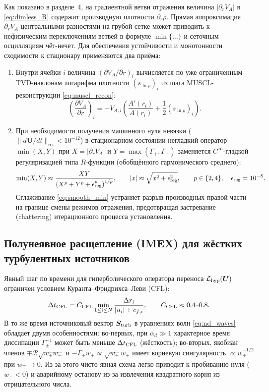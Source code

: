 \documentclass[11pt,a4paper]{article}
\begin{document}
Как показано в разделе~4, на градиентной ветви отражения величина $|\partial_r V_A|$ в \eqref{eq:dimless_R} содержит производную плотности $\partial_r\rho$. Прямая аппроксимация $\partial_r V_A$ центральными разностями на грубой сетке может приводить к нефизическим переключениям ветвей в формуле $\min\{\dots\}$ и сеточным осцилляциям чёт-нечет. Для обеспечения устойчивости и монотонности сходимости к стационару применяются два приёма:
\begin{enumerate}
\item Внутри ячейки $i$ величина $(\partial V_A/\partial r)_i$ вычисляется по уже ограниченным TVD-наклонам логарифма плотности $(s_{\ln\rho})_i$ из шага MUSCL-реконструкции \eqref{eq:muscl_recon}:
\begin{equation}
\left(\frac{\partial V_A}{\partial r}\right)_i = -V_{A,i}\left(\frac{A'(r_i)}{A(r_i)} + \frac{1}{2}(s_{\ln\rho})_i\right).
\label{eq:dva_tvd}
\end{equation}
\item При необходимости получения машинного нуля невязки ($\|d\bm{U}/dt\|_\infty < 10^{-12}$) в стационарном состоянии негладкий оператор $\min(X, Y)$ при $X = |\partial_r V_A|$ и $Y = \max(\Gamma_+,\Gamma_-)$ заменяется $C^\infty$-гладкой регуляризацией типа $R$-функции (обобщённого гармонического среднего):
\begin{equation}
\min(X, Y) \approx \frac{X Y}{\left(X^p + Y^p + \epsilon_{\rm reg}^p\right)^{1/p}}, \qquad
|x| \approx \sqrt{x^2 + \epsilon_{\rm reg}^2}, \qquad p \in \{2, 4\}, \quad \epsilon_{\rm reg} = 10^{-8}.
\label{eq:smooth_min}
\end{equation}
Сглаживание \eqref{eq:smooth_min} устраняет разрыв производных правой части на границе смены режимов отражения, предотвращая застревание (chattering) итерационного процесса установления.
\end{enumerate}

\subsection{Полунеявное расщепление (IMEX) для жёстких турбулентных источников}

Явный шаг по времени для гиперболического оператора переноса $\mathcal{L}_{\rm hyp}(\bm{U})$ ограничен условием Куранта--Фридрихса--Леви (CFL):
\begin{equation}
\Delta t_{\rm CFL} = C_{\rm CFL}\min_{1 \le i \le N}\frac{\Delta r_i}{|u_i| + c_{f,i}}, \qquad C_{\rm CFL} \approx 0.4\text{--}0.8.
\label{eq:cfl_cond}
\end{equation}
В то же время источниковый вектор $\bm{S}_{\rm turb}$ в уравнениях волн \eqref{eq:nd_waves} обладает двумя особенностями: во-первых, при $\alpha_d \gg 1$ характерное время диссипации $\Gamma_\pm^{-1}$ может быть меньше $\Delta t_{\rm CFL}$ (жёсткость); во-вторых, якобиан членов $\mp\mathcal{R}\sqrt{w_+ w_-}$ и $-\Gamma_\pm w_\pm \propto \sqrt{w_\mp}w_\pm$ имеет корневую сингулярность $\propto w_\mp^{-1/2}$ при $w_\mp \to 0$. Из-за этого чисто явная схема легко приводит к пробиванию нуля ($w_- < 0$) и аварийному останову из-за извлечения квадратного корня из отрицательного числа.
\end{document}
